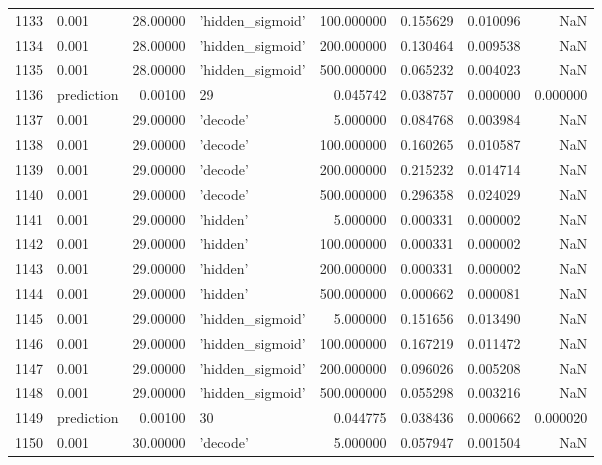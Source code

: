 \documentclass[10pt,a4paper]{article}
\begin{document}
\begin{tabular}{llrlrrrr}
1133 &       0.001 &  28.00000 &   'hidden\_sigmoid' &  100.000000 &  0.155629 &  0.010096 &       NaN \\
1134 &       0.001 &  28.00000 &   'hidden\_sigmoid' &  200.000000 &  0.130464 &  0.009538 &       NaN \\
1135 &       0.001 &  28.00000 &   'hidden\_sigmoid' &  500.000000 &  0.065232 &  0.004023 &       NaN \\
1136 &  prediction &   0.00100 &                 29 &    0.045742 &  0.038757 &  0.000000 &  0.000000 \\
1137 &       0.001 &  29.00000 &           'decode' &    5.000000 &  0.084768 &  0.003984 &       NaN \\
1138 &       0.001 &  29.00000 &           'decode' &  100.000000 &  0.160265 &  0.010587 &       NaN \\
1139 &       0.001 &  29.00000 &           'decode' &  200.000000 &  0.215232 &  0.014714 &       NaN \\
1140 &       0.001 &  29.00000 &           'decode' &  500.000000 &  0.296358 &  0.024029 &       NaN \\
1141 &       0.001 &  29.00000 &           'hidden' &    5.000000 &  0.000331 &  0.000002 &       NaN \\
1142 &       0.001 &  29.00000 &           'hidden' &  100.000000 &  0.000331 &  0.000002 &       NaN \\
1143 &       0.001 &  29.00000 &           'hidden' &  200.000000 &  0.000331 &  0.000002 &       NaN \\
1144 &       0.001 &  29.00000 &           'hidden' &  500.000000 &  0.000662 &  0.000081 &       NaN \\
1145 &       0.001 &  29.00000 &   'hidden\_sigmoid' &    5.000000 &  0.151656 &  0.013490 &       NaN \\
1146 &       0.001 &  29.00000 &   'hidden\_sigmoid' &  100.000000 &  0.167219 &  0.011472 &       NaN \\
1147 &       0.001 &  29.00000 &   'hidden\_sigmoid' &  200.000000 &  0.096026 &  0.005208 &       NaN \\
1148 &       0.001 &  29.00000 &   'hidden\_sigmoid' &  500.000000 &  0.055298 &  0.003216 &       NaN \\
1149 &  prediction &   0.00100 &                 30 &    0.044775 &  0.038436 &  0.000662 &  0.000020 \\
1150 &       0.001 &  30.00000 &           'decode' &    5.000000 &  0.057947 &  0.001504 &       NaN \\

\end{tabular}
\end{document}
